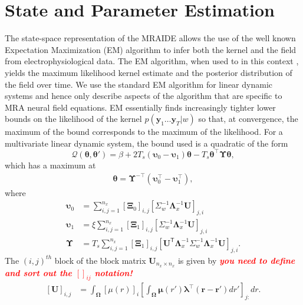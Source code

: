 \documentclass[journal,a4paper]{IEEEtran}
\newcommand{\mike}[1]{\textsf{\emph{\textbf{\textcolor{red}{#1}}}}}
\begin{document}
\section{State and Parameter Estimation}
The state-space representation of the MRAIDE allows the use of the well known Expectation Maximization (EM) algorithm \cite{Dempster1977} to infer both the kernel and the field from electrophysiological data. The EM algorithm, when used to in this context \cite{Dewar2009}, yields the maximum likelihood kernel estimate and the posterior distribution of the field over time. We use the standard EM algorithm for linear dynamic systems \cite{Gibsona2005,Roweis1999,Shumway2000} and hence only describe aspects of the algorithm that are specific to MRA neural field equations. EM essentially finds increasingly tighter lower bounds on the likelihood of the kernel $p(\mathbf{y}_1 \ldots \mathbf{y}_T|w)$ so that, at convergence, the maximum of the bound corresponds to the maximum of the likelihood. For a multivariate linear dynamic system, the bound used is a quadratic of the form
\begin{equation}
 \mathcal Q\left(\boldsymbol \theta,\boldsymbol\theta'\right)=\beta+2T_s\left(\boldsymbol\upsilon_0-\boldsymbol\upsilon_1\right)\boldsymbol\theta-T_s\boldsymbol\theta^\top\boldsymbol\Upsilon\boldsymbol\theta,
\end{equation}
which has a maximum at
\begin{align}
 \boldsymbol \theta= \boldsymbol\Upsilon^{-\top}(\boldsymbol\upsilon_0^\top-\boldsymbol\upsilon_1^\top),
\end{align}
where
\begin{align}\label{eq:upsilon0}
 \boldsymbol\upsilon_0&=\sum_{i,j=1}^{n_x}[\boldsymbol\Xi_0]_{i,j}[\Sigma_{w}^{-1}\boldsymbol\Lambda_{x}^{-1}\mathbf U]_{j,i}\\ 
 \boldsymbol\upsilon_1&=\xi\sum_{i,j=1}^{n_x}[\boldsymbol\Xi_1]_{i,j}[\Sigma_{w}^{-1}\boldsymbol\Lambda_{x}^{-1}\mathbf U]_{j,i}\label{eq:upsilon1} \\
 \boldsymbol\Upsilon&=T_s\sum_{i,j=1}^{n_x}[\boldsymbol\Xi_1]_{i,j}[\mathbf{U}^{\mathsf T} \boldsymbol\Lambda_{x}^{-1}\Sigma_{w}^{-1}\boldsymbol\Lambda_{x}^{-1}\mathbf{U}]_{j,i}\label{eq:Upsilon}.
\end{align}
The $\left(i,j\right)^{th}$ block of the block matrix $\mathbf U_{n_x \times n_x}$ is given by
\mike{you need to define and sort out the $[]_{ij}$ notation!}
\begin{align}
\left[ \mathbf U\right] _{i,j}&=\int_{\boldsymbol \Omega}\left[\mu(r) \right]_i \left[\int_{\boldsymbol\Omega} \boldsymbol\mu\left(r'\right)\boldsymbol \lambda^\top \left(\mathbf{r-r'}\right) dr'\right]_{j:} dr.
\end{align}
\end{document}
